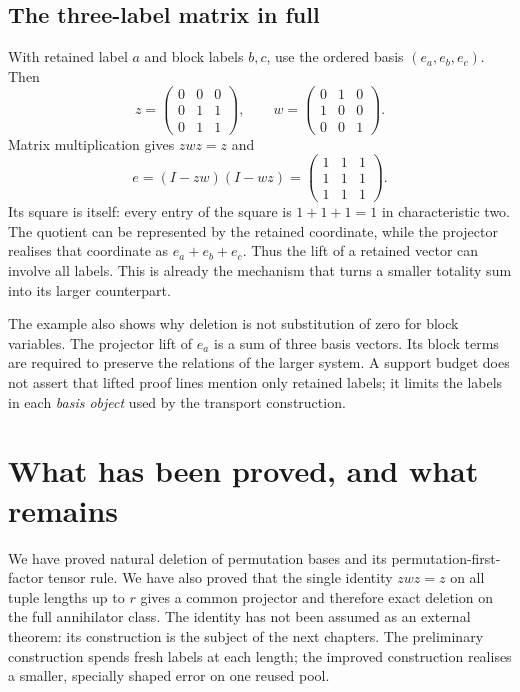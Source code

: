 \subsection{The three-label matrix in full}
With retained label $a$ and block labels $b,c$, use the ordered basis
$(e_a,e_b,e_c)$. Then
\[
 z=\begin{pmatrix}0&0&0\\0&1&1\\0&1&1\end{pmatrix},\qquad
 w=\begin{pmatrix}0&1&0\\1&0&0\\0&0&1\end{pmatrix}.
\]
Matrix multiplication gives $zwz=z$ and
\[
 e=(I-zw)(I-wz)=
       \begin{pmatrix}1&1&1\\1&1&1\\1&1&1\end{pmatrix}.
\]
Its square is itself: every entry of the square is $1+1+1=1$ in
characteristic two. The quotient can be represented by the retained
coordinate, while the projector realises that coordinate as
$e_a+e_b+e_c$. Thus the lift of a retained vector can involve all
labels. This is already the mechanism that turns a smaller totality
sum into its larger counterpart.

The example also shows why deletion is not substitution of zero for
block variables. The projector lift of $e_a$ is a sum of three basis
vectors. Its block terms are required to preserve the relations of
the larger system. A support budget does not assert that lifted proof
lines mention only retained labels; it limits the labels in each
\emph{basis object} used by the transport construction.

\section*{What has been proved, and what remains}
We have proved natural deletion of permutation bases and its
permutation-first-factor tensor rule. We have also proved that the
single identity $zwz=z$ on all tuple lengths up to $r$ gives a common
projector and therefore exact deletion on the full annihilator class.
The identity has not been assumed as an external theorem: its
construction is the subject of the next chapters. The preliminary
construction spends fresh labels at each length; the improved
construction realises a smaller, specially shaped error on one reused
pool.
